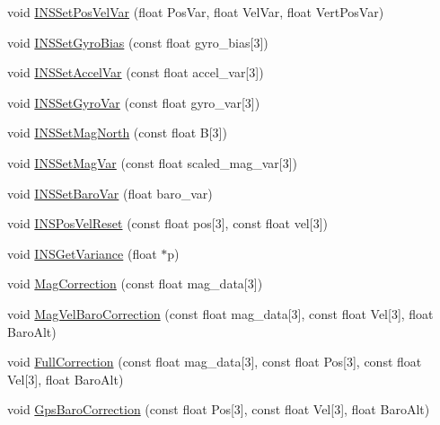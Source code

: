 \begin{DoxyCompactItemize}
\item 
void \hyperlink{group___tau_labs_libraries_ga8894e5945148a0520cd3e4c27f44cdac}{\-I\-N\-S\-Set\-Pos\-Vel\-Var} (float \-Pos\-Var, float \-Vel\-Var, float \-Vert\-Pos\-Var)
\item 
void \hyperlink{group___tau_labs_libraries_gad385ddb89b431a68df14e4de88be3329}{\-I\-N\-S\-Set\-Gyro\-Bias} (const float gyro\-\_\-bias\mbox{[}3\mbox{]})
\item 
void \hyperlink{group___tau_labs_libraries_ga97a7efb6d46aefde3ad20c9b8c44fc60}{\-I\-N\-S\-Set\-Accel\-Var} (const float accel\-\_\-var\mbox{[}3\mbox{]})
\item 
void \hyperlink{group___tau_labs_libraries_gab34cb0f1a9700d0bbf8c0c864311e0e3}{\-I\-N\-S\-Set\-Gyro\-Var} (const float gyro\-\_\-var\mbox{[}3\mbox{]})
\item 
void \hyperlink{group___tau_labs_libraries_gaff5e5ac00ae43701b4dae7eeb9cdfea8}{\-I\-N\-S\-Set\-Mag\-North} (const float \-B\mbox{[}3\mbox{]})
\item 
void \hyperlink{group___tau_labs_libraries_ga0e46db3033f2daeb533de25cb92bbfd9}{\-I\-N\-S\-Set\-Mag\-Var} (const float scaled\-\_\-mag\-\_\-var\mbox{[}3\mbox{]})
\item 
void \hyperlink{group___tau_labs_libraries_ga5316ca3b2372588b1d2340297e976452}{\-I\-N\-S\-Set\-Baro\-Var} (float baro\-\_\-var)
\item 
void \hyperlink{group___tau_labs_libraries_gad01d410c07ad8c74fe875b16246a265c}{\-I\-N\-S\-Pos\-Vel\-Reset} (const float pos\mbox{[}3\mbox{]}, const float vel\mbox{[}3\mbox{]})
\item 
void \hyperlink{group___tau_labs_libraries_ga9e72deeb194e12de4258e48413bfb8f9}{\-I\-N\-S\-Get\-Variance} (float $\ast$p)
\item 
void \hyperlink{group___tau_labs_libraries_ga2b676563f0f8b93d971159b5b9320a5d}{\-Mag\-Correction} (const float mag\-\_\-data\mbox{[}3\mbox{]})
\item 
void \hyperlink{group___tau_labs_libraries_ga2d37f6670dad8a68c1c96282f02f208a}{\-Mag\-Vel\-Baro\-Correction} (const float mag\-\_\-data\mbox{[}3\mbox{]}, const float \-Vel\mbox{[}3\mbox{]}, float \-Baro\-Alt)
\item 
void \hyperlink{group___tau_labs_libraries_gac4dc3ac7ec074007dd65c472a2176c54}{\-Full\-Correction} (const float mag\-\_\-data\mbox{[}3\mbox{]}, const float \-Pos\mbox{[}3\mbox{]}, const float \-Vel\mbox{[}3\mbox{]}, float \-Baro\-Alt)
\item 
void \hyperlink{group___tau_labs_libraries_ga6b469a6d3b312867b0b87c2c70c0749e}{\-Gps\-Baro\-Correction} (const float \-Pos\mbox{[}3\mbox{]}, const float \-Vel\mbox{[}3\mbox{]}, float \-Baro\-Alt)

\end{DoxyCompactItemize}
